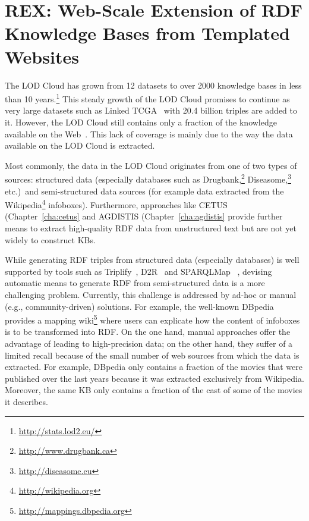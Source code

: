 \chapter{REX: Web-Scale Extension of RDF Knowledge Bases from Templated Websites}
\label{cha:rex}



The \ac{LOD} Cloud has grown from 12 datasets to over 2000 knowledge bases in less than 10 years.\footnote{\url{http://stats.lod2.eu/}}
This steady growth of the \ac{LOD} Cloud promises to continue as very large datasets such as  Linked TCGA~\cite{SAL+13a} with 20.4 billion triples are added to it. 
However, the \ac{LOD} Cloud still contains only a fraction of the knowledge available on the Web~\cite{GER+13}. 
This lack of coverage is mainly due to the way the data available on the \ac{LOD} Cloud is extracted. 

Most commonly, the data in the \ac{LOD} Cloud originates from one of two types of sources: structured data (especially databases such as Drugbank,\footnote{\url{http://www.drugbank.ca}} Diseasome,\footnote{\url{http://diseasome.eu}} etc.)~and semi-structured data sources (for example data extracted from the Wikipedia\footnote{\url{http://wikipedia.org}} infoboxes). 
Furthermore, approaches like CETUS (Chapter~\ref{cha:cetus} and  AGDISTIS (Chapter~\ref{cha:agdistis} provide further means to extract high-quality \ac{RDF} data from unstructured text but are not yet widely to construct \ac{KB}s.

While generating \ac{RDF} triples from structured data (especially databases) is well supported by tools such as Triplify~\cite{DBLP:dblp_conf/www/AuerDLHA09}, D2R~\cite{Bizer04} and SPARQLMap~\cite{DBLP:conf/aswc/UnbehauenSA12}
, devising automatic means to generate \ac{RDF} from semi-structured data is a more challenging  problem. 
Currently, this challenge is addressed by ad-hoc or manual (e.g., community-driven) solutions. 
For example, the well-known DBpedia~\cite{dbpedia-swj} provides a mapping wiki\footnote{\url{http://mappings.dbpedia.org}} where users can explicate how the content of infoboxes is to be transformed into \ac{RDF}. 
On the one hand, manual approaches offer the advantage of leading to high-precision data; on the other hand, they suffer of a limited recall because of the small number of web sources from which the data is extracted. 
For example, DBpedia only contains a fraction of the movies that were published over the last years because it was extracted exclusively from Wikipedia.
Moreover, the same  \ac{KB} only contains a fraction of the cast of some of the movies it describes.

